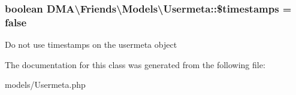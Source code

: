 \subsubsection[{\$timestamps}]{\setlength{\rightskip}{0pt plus 5cm}boolean D\+M\+A\textbackslash{}\+Friends\textbackslash{}\+Models\textbackslash{}\+Usermeta\+::\$timestamps = false}\label{classDMA_1_1Friends_1_1Models_1_1Usermeta_a085486010d2c88f8676ac2e4fdbc257d}
Do not use timestamps on the usermeta object 

The documentation for this class was generated from the following file\+:\begin{DoxyCompactItemize}
\item 
models/Usermeta.\+php\end{DoxyCompactItemize}
